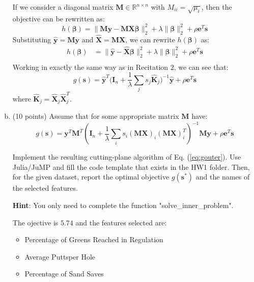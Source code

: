 \documentclass{article}%
\newcommand{\R}{\mathbb{R}}
\begin{document}
\begin{enumerate}[(a)]
\begin{solution}
    If we consider a diagonal matrix $\bm{M}\in\R^{n\times n}$ with $M_{ii}=\sqrt{\mu_i}$, then the objective can be rewritten as:
    \begin{equation}
            h(\bm{\beta})=\|\bm{My}-\bm{MX\beta}\|_2^2+\lambda \|\bm{\beta}\|_2^2+\rho\bm{e}^T\bm{s}
    \end{equation}
    Substituting $\hat{\bm{y}}=\bm{My}$ and $\hat{\bm{X}}=\bm{MX}$, we can rewrite $h(\bm{\beta})$ as:
    \begin{equation}
        \begin{aligned}
            h(\bm{\beta})&=\|\hat{\bm{y}}-\hat{\bm{X}}\bm{\beta}\|_2^2+\lambda \|\bm{\beta}\|_2^2+\rho\bm{e}^T\bm{s}\\
        \end{aligned}
    \end{equation}
    Working in exactly the same way as in Recitation $2$, we can see that:
    \begin{equation}
        g(\bm{s})=\hat{\bm{y}}^T\Bigg(\bm{I}_n+\frac{1}{\lambda}\sum_j s_j\hat{\bm{K}}_j\Bigg)^{-1}\hat{\bm{y}}+\rho\bm{e}^T\bm{s}
    \end{equation}
    where $\hat{\bm{K}}_j=\hat{\bm{X}}_j\hat{\bm{X}}_j^T$.

\end{solution}

\item (10 points) Assume that for some appropriate matrix $\bm{M}$ have:
\begin{equation}
        g(\bm{s})=\bm{y}^T\bm{M}^T(\bm{I}_n+\frac{1}{\lambda} \sum_i s_i(\bm{MX})_i(\bm{MX})_i^T)^{-1}\bm{My}+\rho \bm{e}^T\bm{s}
\end{equation}

Implement the resulting cutting-plane algorithm of Eq. (\ref{eq:gouter}).
Use Julia/JuMP and fill the code template that exists in the HW1 folder. 
Then, for the given dataset, report the optimal objective $g(\bm{s}^*)$ and the names of the selected features.

\textbf{Hint}: You only need to complete the function "solve\_inner\_problem".

\begin{solution}
    The ojective is $5.74$ and the features selected are:
    \begin{itemize}
        \item Percentage of Greens Reached in Regulation
        \item Average Puttsper Hole
        \item Percentage of Sand Saves
    \end{itemize}
\end{solution}


\end{enumerate}







\end{document}
